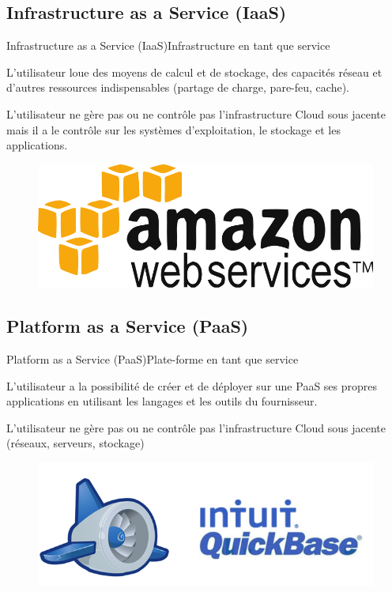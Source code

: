 \documentclass{beamer}
\begin{document}
\subsection{Infrastructure as a Service (IaaS)}
\begin{frame}{Infrastructure as a Service (IaaS)}{Infrastructure en tant que service}
\begin{block}{}
L’utilisateur loue des moyens de calcul et de stockage, des capacités réseau et d’autres ressources indispensables (partage de charge, pare-feu, cache). 
\end{block}
\pause
\begin{block}{}
L’utilisateur ne gère pas ou ne contrôle pas l’infrastructure Cloud sous jacente mais il a le contrôle sur les systèmes d’exploitation, le stockage et les applications.
\end{block}
\pause
\begin{figure}[centering]
    \includegraphics[scale=0.25]{amazon}
\end{figure}
\end{frame}



\subsection{Platform as a Service (PaaS)}
\begin{frame}{Platform as a Service (PaaS)}{Plate-forme en tant que service}
\begin{block}{}
L’utilisateur a la possibilité de créer et de déployer sur une PaaS ses propres applications en utilisant les langages et les outils du fournisseur.
\end{block}
\begin{block}{}
L’utilisateur ne gère pas ou ne contrôle pas l’infrastructure Cloud sous jacente (réseaux, serveurs, stockage)
\end{block}
\pause
\begin{figure}[centering]
    \includegraphics[scale=0.4]{Paas}
\end{figure}
\end{frame}
\end{document}
